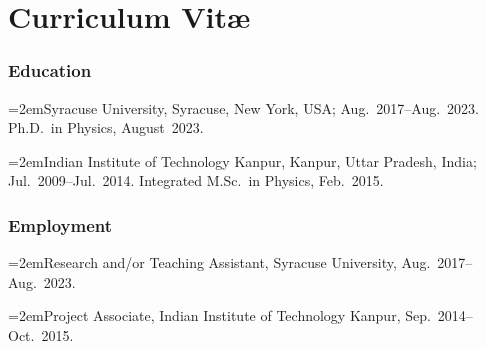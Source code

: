 

\chapter*{Curriculum Vit\ae}
\thispagestyle{empty}

\def\hangpar{\noindent\hangindent=2em}

\subsection*{Education}

\hangpar Syracuse University, Syracuse, New York, USA; Aug.~2017--Aug.~2023.\\
Ph.D.~in Physics, August~2023.

\hangpar Indian Institute of Technology Kanpur, Kanpur, Uttar Pradesh, India; Jul.~2009--Jul.~2014. Integrated M.Sc.~in Physics, Feb.~2015.

\subsection*{Employment}

\hangpar Research and/or Teaching Assistant, Syracuse University, Aug.~2017--Aug.~2023.

\hangpar Project Associate, Indian Institute of Technology Kanpur, Sep.~2014--Oct.~2015.


